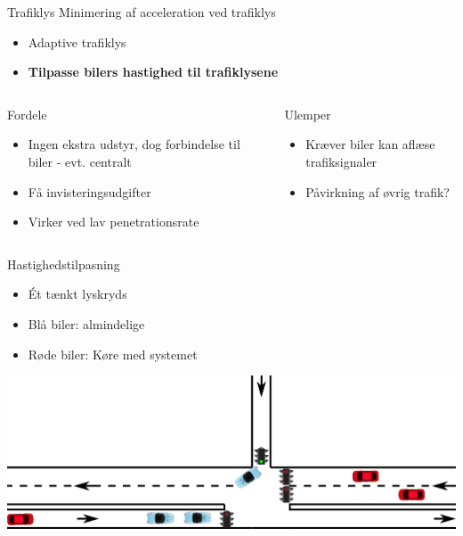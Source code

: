 \begin{frame}{Trafiklys}
Minimering af acceleration ved trafiklys
\begin{itemize}
\item Adaptive trafiklys
\item \textbf{Tilpasse bilers hastighed til trafiklysene}
\end{itemize}


\begin{center}
\begin{columns}
\begin{column}{0.5\textwidth}
Fordele
\begin{itemize}
\item Ingen ekstra udstyr, dog forbindelse til biler - evt. centralt
\item Få invisteringsudgifter 
\item Virker ved lav penetrationsrate
\end{itemize}
\end{column}

\begin{column}{0.5\textwidth}
Ulemper
\begin{itemize}
\item Kræver biler kan aflæse trafiksignaler
\item Påvirkning af øvrig trafik?
\end{itemize}
\vspace{1.2cm}
\end{column}
\end{columns}
\end{center}
\end{frame}

\begin{frame}{Hastighedstilpasning}
\begin{itemize}
\item Ét tænkt lyskryds
\item Blå biler: almindelige
\item Røde biler: Køre med systemet
\end{itemize}
\includegraphics[width=1\textwidth]{images/eks1.png}
\end{frame}

